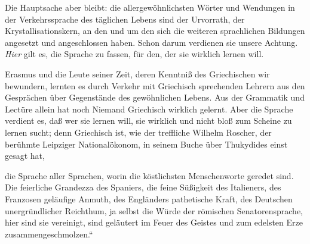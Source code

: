 Die Hauptsache aber bleibt: die allergewöhnlichsten Wörter und Wendungen
in der Verkehrssprache des
täglichen Lebens sind der Urvorrath, der Krystallisationskern,
an den und um den sich die weiteren sprachlichen Bildungen angesetzt
und angeschlossen haben. Schon darum verdienen sie unsere Achtung.
\emph{Hier} gilt es, die Sprache zu fassen, für den, der sie wirklich
lernen will.

Erasmus und die Leute seiner Zeit, deren Kenntniß
des Griechischen wir bewundern, lernten es durch Verkehr
mit Griechisch sprechenden Lehrern aus den Gesprächen über Gegenstände
des gewöhnlichen Lebens. Aus der Grammatik und Lectüre allein hat
noch Niemand Griechisch wirklich gelernt. Aber die Sprache verdient
es, daß wer sie lernen will, sie wirklich und nicht bloß zum Scheine
zu lernen sucht; denn Griechisch ist, wie der treffliche Wilhelm
Roscher, der berühmte Leipziger Nationalökonom, in seinem Buche über
Thukydides einst gesagt hat,

\begin{quotedquotation}\noindent die Sprache aller Sprachen, worin
die köstlichsten Menschenworte geredet sind. Die feierliche Grandezza
des Spaniers, die feine Süßigkeit des Italieners, des Franzosen geläufige
Anmuth, des Engländers pathetische Kraft, des Deutschen unergründlicher
Reichthum, ja selbst die Würde der römischen Senatorensprache, hier
sind sie vereinigt, sind geläutert im Feuer des Geistes und zum edelsten
Erze zusammengeschmolzen.\unskip``\end{quotedquotation} 
